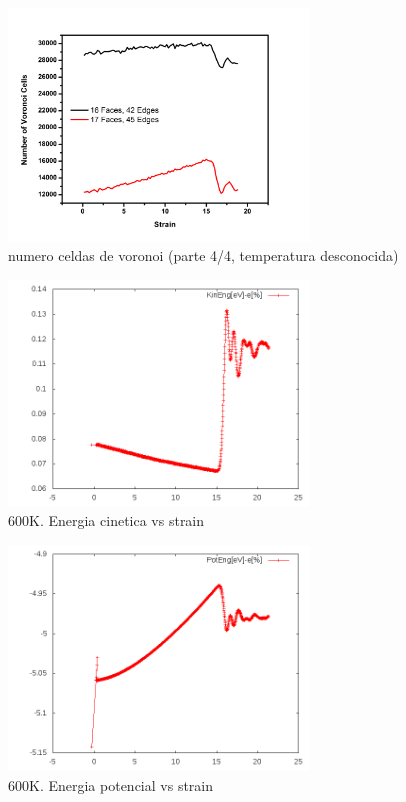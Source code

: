\documentclass[10pt, oneside]{article} %
\begin{document}
\begin{figure}[H]
\centering
\includegraphics[width=8cm]{Figures/TRAC_Num_Step_E.png}
\caption{numero celdas de voronoi (parte 4/4, temperatura desconocida)}
\end{figure}

\begin{figure}[H]
\centering
\includegraphics[width=8cm]{Figures/600K_KinEnergy.png}
\caption{600K. Energia cinetica vs strain}
\end{figure}

\begin{figure}[H]
\centering
\includegraphics[width=8cm]{Figures/600K_PotEnergy.png}
\caption{600K. Energia potencial vs strain}
\end{figure}
\end{document}
